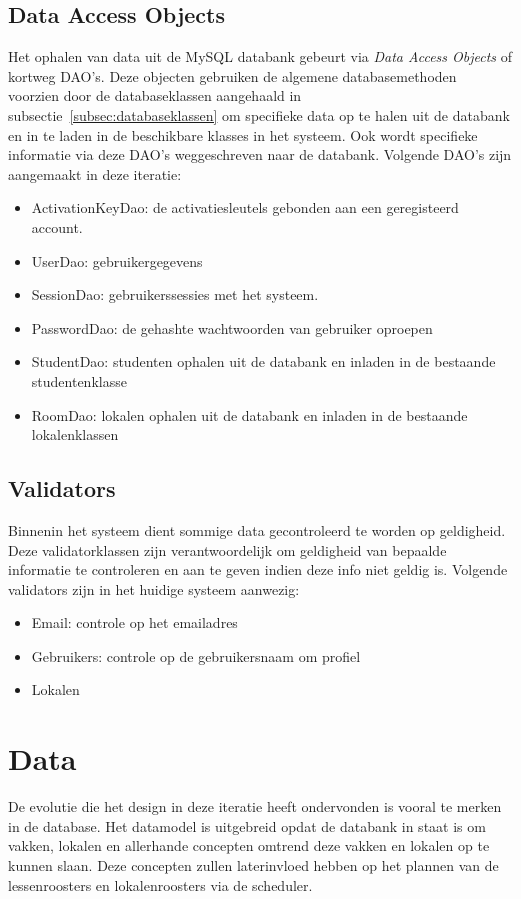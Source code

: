\subsection{Data Access Objects}
\label{subsec:dao}

Het ophalen van data uit de MySQL databank gebeurt via \emph{Data Access Objects} of kortweg DAO's. 
Deze objecten gebruiken de algemene databasemethoden voorzien door de databaseklassen aangehaald in subsectie~\ref{subsec:databaseklassen} om specifieke data op te halen uit de databank en in te laden in de beschikbare klasses in het systeem. 
Ook wordt specifieke informatie via deze DAO's weggeschreven naar de databank. 
Volgende DAO's zijn aangemaakt in deze iteratie:

\begin{itemize}
	\item ActivationKeyDao: de activatiesleutels gebonden aan een geregisteerd account. 
	\item UserDao: gebruikergegevens
	\item SessionDao: gebruikerssessies met het systeem.
	\item PasswordDao: de gehashte wachtwoorden van gebruiker oproepen
	\item StudentDao: studenten ophalen uit de databank en inladen in de bestaande studentenklasse
	\item RoomDao: lokalen ophalen uit de databank en inladen in de bestaande lokalenklassen
\end{itemize}

\subsection{Validators}
\label{subsec:validators}

Binnenin het systeem dient sommige data gecontroleerd te worden op geldigheid. 
Deze validatorklassen zijn verantwoordelijk om geldigheid van bepaalde informatie te controleren en aan te geven indien deze info niet geldig is. 
Volgende validators zijn in het huidige systeem aanwezig:

\begin{itemize}
	\item Email: controle op het emailadres
	\item Gebruikers: controle op de gebruikersnaam om profiel
	\item Lokalen
\end{itemize}

\section{Data}
\label{sec:data}
De evolutie die het design in deze iteratie heeft ondervonden is vooral te merken in de database.
Het datamodel is uitgebreid opdat de databank in staat is om vakken, lokalen en allerhande concepten omtrend deze vakken en lokalen op te kunnen slaan. Deze concepten zullen laterinvloed hebben op het plannen van de lessenroosters en lokalenroosters via de scheduler.\\

